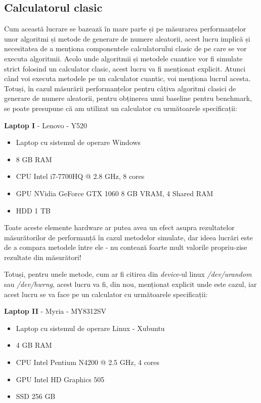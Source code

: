 \subsection{Calculatorul clasic}

Cum această lucrare se bazează în mare parte și pe măsurarea performanțelor unor algoritmi și metode de generare de numere aleatorii, acest lucru implică și necesitatea de a menționa componentele calculatorului clasic de pe care se vor executa algoritmii. Acolo unde algoritmii și metodele cuantice vor fi simulate strict folosind un calculator clasic, acest lucru va fi menționat explicit. Atunci când voi executa metodele pe un calculator cuantic, voi menționa lucrul acesta. Totuși, în cazul măsurării performanțelor pentru câțiva algoritmi clasici de generare de numere aleatorii, pentru obținerea unui baseline pentru benchmark, se poate presupune că am utilizat un calculator cu următoarele specificații:

\vspace{0.5cm}
\textbf{Laptop I} - Lenovo - Y520
\begin{itemize}
    \item Laptop cu sistemul de operare Windows
    \item 8 GB RAM
    \item CPU Intel i7-7700HQ @ 2.8 GHz, 8 cores
    \item GPU NVidia GeForce GTX 1060 8 GB VRAM, 4 Shared RAM
    \item HDD 1 TB
\end{itemize}

Toate aceste elemente hardware ar putea avea un efect asupra rezultatelor măsurătorilor de performanță în cazul metodelor simulate, dar ideea lucrări este de a compara metodele între ele - nu contează foarte mult valorile propriu-zise rezultate din măsurători!

Totuși, pentru unele metode, cum ar fi citirea din \textit{device}-ul linux \textit{/dev/urandom} sau \textit{/dev/hwrng}, acest lucru va fi, din nou, menționat explicit unde este cazul, iar acest lucru se va face pe un calculator cu următoarele specificații:


\vspace{0.5cm}
\textbf{Laptop II}  - Myria - MY8312SV
\begin{itemize}
    \item Laptop cu sistemul de operare Linux - Xubuntu
    \item 4 GB RAM
    \item CPU Intel Pentium N4200 @ 2.5 GHz, 4 cores
    \item GPU Intel HD Graphics 505
    \item SSD 256 GB
\end{itemize}

